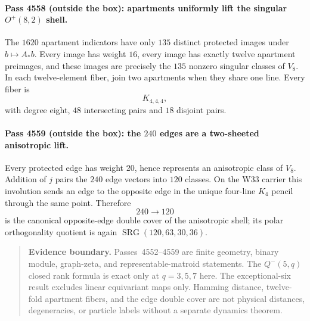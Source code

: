 \paragraph{Pass 4558 (outside the box): apartments uniformly lift the singular $O^+(8,2)$ shell.}
The $1620$ apartment indicators have only $135$ distinct protected images under
$b\mapsto A_*b$.  Every image has weight $16$, every image has exactly twelve
apartment preimages, and these images are precisely the $135$ nonzero singular
classes of $V_8$.  In each twelve-element fiber, join two apartments when they
share one line.  Every fiber is
\[
 \boxed{K_{4,4,4}},
\]
with degree eight, $48$ intersecting pairs and $18$ disjoint pairs.

\paragraph{Pass 4559 (outside the box): the $240$ edges are a two-sheeted anisotropic lift.}
Every protected edge has weight $20$, hence represents an anisotropic class of
$V_8$.  Addition of $j$ pairs the $240$ edge vectors into $120$ classes.  On the
W33 carrier this involution sends an edge to the opposite edge in the unique
four-line $K_4$ pencil through the same point.  Therefore
\[
 \boxed{240\longrightarrow120}
\]
is the canonical opposite-edge double cover of the anisotropic shell; its polar
orthogonality quotient is again $\operatorname{SRG}(120,63,30,36)$.

\begin{quote}\small
\textbf{Evidence boundary.} Passes~4552--4559 are finite geometry, binary
module, graph-zeta, and representable-matroid statements.  The $Q^-(5,q)$
closed rank formula is exact only at $q=3,5,7$ here.  The exceptional-six result
excludes linear equivariant maps only.  Hamming distance, twelve-fold apartment
fibers, and the edge double cover are not physical distances, degeneracies, or
particle labels without a separate dynamics theorem.
\end{quote}

%

